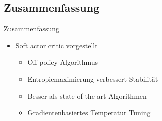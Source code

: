 \subsection{Zusammenfassung}
\begin{frame}{Zusammenfassung}
        \begin{itemize}
            \item Soft actor critic vorgestellt
            \begin{itemize}
                \item Off policy Algorithmus
                \item Entropiemaximierung verbessert Stabilität
                \item Besser als state-of-the-art Algorithmen 
                \item Gradientenbasiertes Temperatur Tuning
            \end{itemize} 
        \end{itemize}
\end{frame}

